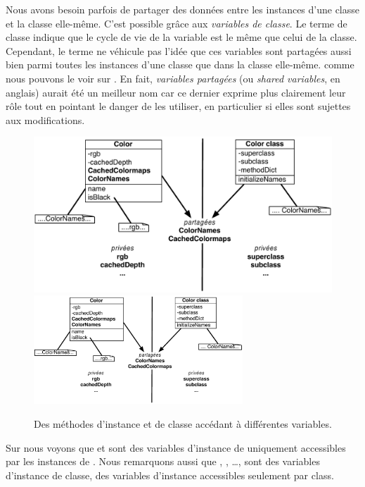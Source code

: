 \documentclass[a4paper,10pt,twoside]{book}
\begin{document}
Nous avons besoin parfois de partager des donn\'ees entre les instances d'une classe et la classe elle-m\^eme.
C'est possible gr\^ace aux \emph{variables de classe}. 
Le terme  de classe indique que le cycle de vie
de la variable est le m\^eme que celui de la classe. Cependant, 
le terme ne v\'ehicule pas l'id\'ee que ces variables sont partag\'ees aussi bien parmi toutes
les instances d'une classe que dans la classe elle-m\^eme.
comme nous pouvons le voir sur .
En fait, \emph{variables partag\'ees} (ou \emph{shared variables}, en anglais) aurait
\'et\'e un meilleur nom car ce dernier exprime plus clairement leur r\^ole
tout en pointant le danger de les utiliser, en particulier si elles sont 
sujettes aux modifications.

\begin{figure}[htb]
\begin{center}
\ifluluelse
	{\includegraphics[width=\textwidth]{privateSharedVarColor}}
	{\includegraphics[width=0.7\textwidth]{privateSharedVarColor}}
\caption{Des m\'ethodes d'instance et de classe acc\'edant \`a diff\'erentes
variables.\label{fig:privateSharedVar}}
\end{center}
\end{figure}

Sur  nous voyons que  et  sont
des variables d'instance de  uniquement accessibles par les 
instances de .
Nous remarquons aussi que , , \ldots \etc, sont des variables d'instance de classe, \ie des variables d'instance  accessibles seulement par  class.
\end{document}
